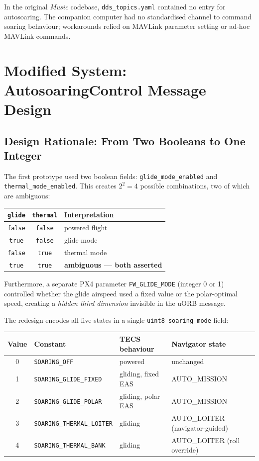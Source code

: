 \documentclass[12pt,a4paper]{article}
\begin{document}
In the original \emph{Music} codebase, \texttt{dds\_topics.yaml} contained
no entry for autosoaring. The companion computer had no standardised channel
to command soaring behaviour; workarounds relied on MAVLink parameter
setting or ad-hoc MAVLink commands.

\section{Modified System: AutosoaringControl Message Design}

\subsection{Design Rationale: From Two Booleans to One Integer}

The first prototype used two boolean fields:
\texttt{glide\_mode\_enabled} and \texttt{thermal\_mode\_enabled}.
This creates $2^2 = 4$ possible combinations, two of which are ambiguous:

\begin{center}
\begin{tabular}{ccp{6cm}}
\toprule
\texttt{glide} & \texttt{thermal} & Interpretation \\
\midrule
\texttt{false} & \texttt{false} & powered flight \\
\texttt{true}  & \texttt{false} & glide mode \\
\texttt{false} & \texttt{true}  & thermal mode \\
\texttt{true}  & \texttt{true}  & \textbf{ambiguous --- both asserted} \\
\bottomrule
\end{tabular}
\end{center}

Furthermore, a separate PX4 parameter \texttt{FW\_GLIDE\_MODE} (integer
0 or 1) controlled whether the glide airspeed used a fixed value or the
polar-optimal speed, creating a \emph{hidden third dimension} invisible in
the uORB message.

The redesign encodes all five states in a single \texttt{uint8
soaring\_mode} field:

\begin{center}
\begin{tabular}{clll}
\toprule
Value & Constant & TECS behaviour & Navigator state \\
\midrule
0 & \texttt{SOARING\_OFF}            & powered        & unchanged \\
1 & \texttt{SOARING\_GLIDE\_FIXED}   & gliding, fixed EAS & AUTO\_MISSION \\
2 & \texttt{SOARING\_GLIDE\_POLAR}   & gliding, polar EAS & AUTO\_MISSION \\
3 & \texttt{SOARING\_THERMAL\_LOITER}& gliding        & AUTO\_LOITER (navigator-guided) \\
4 & \texttt{SOARING\_THERMAL\_BANK}  & gliding        & AUTO\_LOITER (roll override) \\
\bottomrule
\end{tabular}
\end{center}
\end{document}
